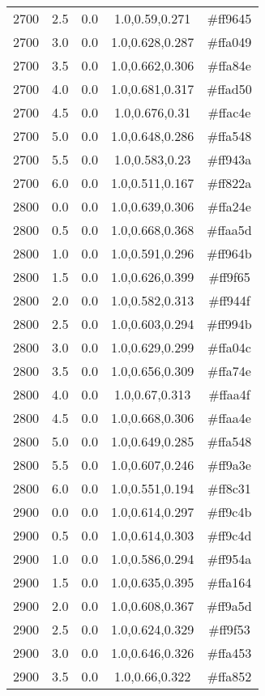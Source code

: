 \begin{tabular}{ccccc}
2700 & 2.5 & 0.0 & 1.0,0.59,0.271 & \#ff9645 \\ 
2700 & 3.0 & 0.0 & 1.0,0.628,0.287 & \#ffa049 \\ 
2700 & 3.5 & 0.0 & 1.0,0.662,0.306 & \#ffa84e \\ 
2700 & 4.0 & 0.0 & 1.0,0.681,0.317 & \#ffad50 \\ 
2700 & 4.5 & 0.0 & 1.0,0.676,0.31 & \#ffac4e \\ 
2700 & 5.0 & 0.0 & 1.0,0.648,0.286 & \#ffa548 \\ 
2700 & 5.5 & 0.0 & 1.0,0.583,0.23 & \#ff943a \\ 
2700 & 6.0 & 0.0 & 1.0,0.511,0.167 & \#ff822a \\ 
2800 & 0.0 & 0.0 & 1.0,0.639,0.306 & \#ffa24e \\ 
2800 & 0.5 & 0.0 & 1.0,0.668,0.368 & \#ffaa5d \\ 
2800 & 1.0 & 0.0 & 1.0,0.591,0.296 & \#ff964b \\ 
2800 & 1.5 & 0.0 & 1.0,0.626,0.399 & \#ff9f65 \\ 
2800 & 2.0 & 0.0 & 1.0,0.582,0.313 & \#ff944f \\ 
2800 & 2.5 & 0.0 & 1.0,0.603,0.294 & \#ff994b \\ 
2800 & 3.0 & 0.0 & 1.0,0.629,0.299 & \#ffa04c \\ 
2800 & 3.5 & 0.0 & 1.0,0.656,0.309 & \#ffa74e \\ 
2800 & 4.0 & 0.0 & 1.0,0.67,0.313 & \#ffaa4f \\ 
2800 & 4.5 & 0.0 & 1.0,0.668,0.306 & \#ffaa4e \\ 
2800 & 5.0 & 0.0 & 1.0,0.649,0.285 & \#ffa548 \\ 
2800 & 5.5 & 0.0 & 1.0,0.607,0.246 & \#ff9a3e \\ 
2800 & 6.0 & 0.0 & 1.0,0.551,0.194 & \#ff8c31 \\ 
2900 & 0.0 & 0.0 & 1.0,0.614,0.297 & \#ff9c4b \\ 
2900 & 0.5 & 0.0 & 1.0,0.614,0.303 & \#ff9c4d \\ 
2900 & 1.0 & 0.0 & 1.0,0.586,0.294 & \#ff954a \\ 
2900 & 1.5 & 0.0 & 1.0,0.635,0.395 & \#ffa164 \\ 
2900 & 2.0 & 0.0 & 1.0,0.608,0.367 & \#ff9a5d \\ 
2900 & 2.5 & 0.0 & 1.0,0.624,0.329 & \#ff9f53 \\ 
2900 & 3.0 & 0.0 & 1.0,0.646,0.326 & \#ffa453 \\ 
2900 & 3.5 & 0.0 & 1.0,0.66,0.322 & \#ffa852 \\ 

\end{tabular}
